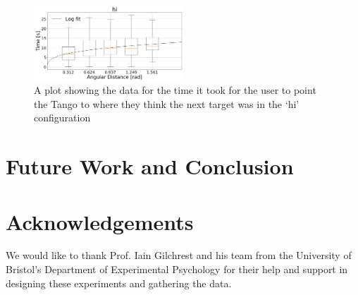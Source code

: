 \documentclass[format=sigconf, review=true, screen=true, anonymous=true]{acmart}
\begin{document}
\begin{figure}
  \centering
  \includegraphics[width=0.5\textwidth]{figures/fitts_hi.png}
  \caption{A plot showing the data for the time it took for the user to point the Tango to where they think the next target was in the `hi' configuration}
  \label{fig:fitts-lo}
\end{figure}

\section{Future Work and Conclusion}

\section{Acknowledgements}

We would like to thank Prof. Iain Gilchrest and his team from the University of Bristol's Department of Experimental Psychology for their help and support in designing these experiments and gathering the data. 



\end{document}
